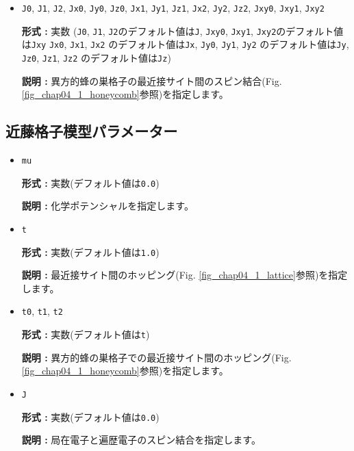 \begin{itemize}
\item \verb|J0|, \verb|J1|, \verb|J2|, \verb|Jx0|, \verb|Jy0|, \verb|Jz0|, \verb|Jx1|, \verb|Jy1|, \verb|Jz1|, 
  \verb|Jx2|, \verb|Jy2|, \verb|Jz2|, \verb|Jxy0|, \verb|Jxy1|, \verb|Jxy2|

{\bf 形式 :} 実数 (\verb|J0|, \verb|J1|, \verb|J2|のデフォルト値は\verb|J|, 
\verb|Jxy0|, \verb|Jxy1|,  \verb|Jxy2|のデフォルト値は\verb|Jxy|
\verb|Jx0|, \verb|Jx1|, \verb|Jx2| のデフォルト値は\verb|Jx|,
\verb|Jy0|, \verb|Jy1|, \verb|Jy2| のデフォルト値は\verb|Jy|,
\verb|Jz0|, \verb|Jz1|, \verb|Jz2| のデフォルト値は\verb|Jz|)

{\bf 説明 :} 異方的蜂の巣格子の最近接サイト間のスピン結合(Fig. \ref{fig_chap04_1_honeycomb}参照)を指定します。

\end{itemize}

\subsection{近藤格子模型パラメーター}
\begin{itemize}
\item \verb|mu|

{\bf 形式 :} 実数(デフォルト値は\verb|0.0|)

{\bf 説明 :} 化学ポテンシャルを指定します。

\item \verb|t|

{\bf 形式 :} 実数(デフォルト値は\verb|1.0|)

{\bf 説明 :} 最近接サイト間のホッピング(Fig. \ref{fig_chap04_1_lattice}参照)を指定します。

\item \verb|t0|, \verb|t1|, \verb|t2|

{\bf 形式 :} 実数(デフォルト値は\verb|t|)

{\bf 説明 :} 異方的蜂の巣格子での最近接サイト間のホッピング(Fig. \ref{fig_chap04_1_honeycomb}参照)を指定します。

\item \verb|J|

{\bf 形式 :} 実数(デフォルト値は\verb|0.0|)

{\bf 説明 :} 局在電子と遍歴電子のスピン結合を指定します。
\end{itemize}

